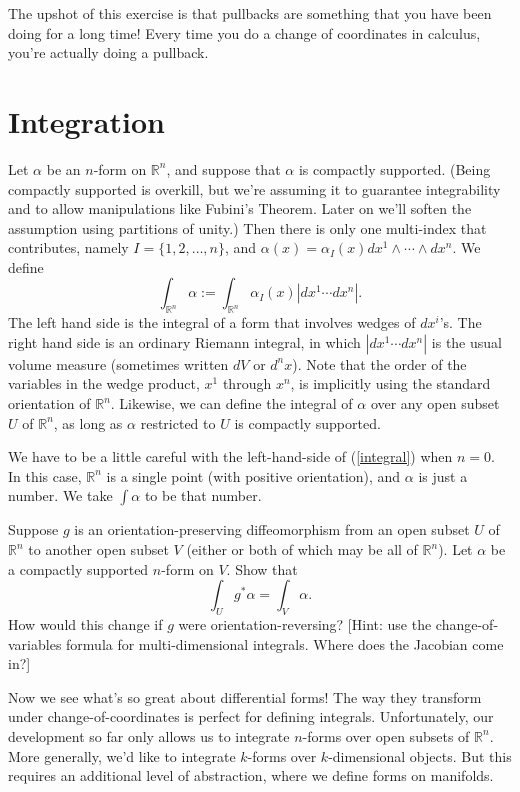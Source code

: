 \documentclass[12pt]{amsbook}
\newcommand{\be}{\begin{equation}}
\newcommand{\ee}{\end{equation}}
\newcommand{\R}{{\mathbb R}}
\theoremstyle{definition}
\begin{document}
The upshot of this exercise is that pullbacks are something that you have been
doing for a long time! Every time you do a change of coordinates in calculus,
you're actually doing a pullback. 

\section{Integration}

Let $\alpha$ be an $n$-form on $\R^n$, and suppose that $\alpha$ is
compactly supported. (Being compactly supported is overkill, but we're
assuming it to guarantee integrability and to allow manipulations like
Fubini's Theorem. Later on we'll soften the assumption using
partitions of unity.) Then there is only one multi-index that
contributes, namely $I=\{1,2,\ldots,n\}$, and $\alpha(x) = \alpha_I(x)
dx^1 \wedge \cdots \wedge dx^n$. We define \be \label{integral} 
\int_{\R^n} \alpha :=
\int_{\R^n} \alpha_I(x) |dx^1 \cdots dx^n|. \ee The left hand side is
the integral of a form that involves wedges of $dx^i$'s. The right
hand side is an ordinary Riemann integral, in which $|dx^1\cdots dx^n|$
is the usual volume measure (sometimes written $dV$ or $d^nx$). 
Note that the order of the variables in the wedge product,
$x^1$ through $x^n$, is implicitly using the standard orientation of
$\R^n$.  Likewise, we can define the integral of $\alpha$ over any
open subset $U$ of $\R^n$, as long as $\alpha$ restricted to $U$ is
compactly supported.

We have to be a little careful with the left-hand-side of (\ref{integral})
when $n=0$. In this case, $\R^n$ is a single point (with 
positive orientation), and $\alpha$ is just 
a number. We take $\int \alpha$ to be that number. 

\smallskip

 Suppose $g$ is an orientation-preserving
diffeomorphism from an open subset $U$ of $\R^n$ to another open
subset $V$ (either or both of which may be all of $\R^n$). Let
$\alpha$ be a compactly supported $n$-form on $V$. Show that
$$\int_U g^* \alpha = \int_V \alpha.$$
How would this change if $g$ were orientation-reversing? [Hint: use the change-of-variables formula for multi-dimensional 
integrals. Where does the Jacobian come in?]

Now we see what's so great about differential forms! The way they
transform under change-of-coordinates is perfect for defining
integrals. Unfortunately, our development so far only allows us to
integrate $n$-forms over open subsets of $\R^n$. More generally, we'd
like to integrate $k$-forms over $k$-dimensional objects. But this
requires an additional level of abstraction, where we define forms on
manifolds.
\end{document}

